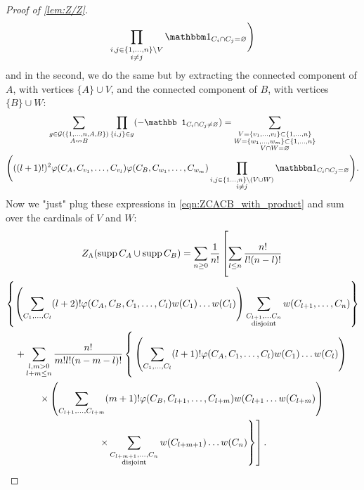 \documentclass{article}
\DeclareMathOperator{\disj}{disjoint}
\DeclareMathOperator{\supp}{supp}
\begin{document}
\begin{proof}[Proof of \cref{lem:Z/Z}]
\begin{multline*}
         \prod_{\substack{i,j\in \{1,\ldots,n\}\setminus V\\i\neq j}}\mathbbm 1_{C_i\cap C_j=\varnothing}\Biggr)
     \end{multline*}
     and in the second, we do the same but by extracting the connected component of $A$, with vertices $\{A\}\cup V$, and the connected component of $B$, with vertices $\{B\}\cup W$:   
     \begin{multline*}
         \sum_{\substack{g \in\mathcal G (\{1,\ldots,n,A,B\})\\A\nleftrightarrow B}}\prod_{\{i,j\}\in g}(-\mathbb 1_{C_i\cap C_j\neq\varnothing})=\sum_{\substack{V=\{v_1,\ldots,v_l\}\subset \{1,\ldots,n\}\\
                 W=\{w_1,\ldots,w_m\}\subset\{1,\ldots,n\}\\
                 V\cap W=\varnothing}}\\\Biggl(((l+1)!)^2\varphi(C_A,C_{v_1},\ldots,C_{v_l})\varphi(C_B,C_{w_1},\ldots,C_{w_m})
         \prod_{\substack{i,j\in \{1\ldots,n\}\setminus (V \cup W)\\i\neq j}}\mathbbm 1_{C_i\cap C_j=\varnothing}\Biggr).
     \end{multline*}
     Now we "just" plug these expressions in \cref{eqn:ZCACB_with_product} and sum over the cardinals of $V$ and $W$:        \begin{multline*}
         Z_\Lambda(\supp C_A\cup \supp C_B)=\sum_{n\geq 0}\frac 1{n!}\left[\sum_{l\leq n} \frac{n!}{l!(n-l)!}
         \vphantom{\sum_{\substack{C_{l+m+1},\ldots,C_{n}\\\disj}}w(C_{l+m+1})\ldots w(C_n)}\right.\\
         \left\{\left(\sum_{C_1,\ldots,C_l}(l+2)!\varphi(C_A,C_B,C_1,\ldots,C_l)w(C_1)\ldots w(C_l)\right)         
         \sum_{\substack{C_{l+1},\ldots C_n\\\disj}}w(C_{l+1},\ldots,C_n)\right\}\\
         +\sum_{\substack{l,m>0\\l+m\leq n}}\frac{n!}{m!l!(n-m-l)!}
         \left\{\vphantom{\sum_{\substack{C_{l+m+1},\ldots,C_{n}\\\disj}}w(C_{l+m+1})\ldots w(C_n)}\left(\sum_{C_1,\ldots,C_l}(l+1)!\varphi(C_A,C_1,\ldots,C_l)w(C_1)\ldots w(C_l)\right)\right.\\
         \times
         \left(\sum_{C_{l+1},\ldots,C_{l+m}}(m+1)!\varphi(C_B,C_{l+1},\ldots,C_{l+m})w(C_{l+1}\ldots w(C_{l+m})\right)
         \\
         \left.\left.\times
         \sum_{\substack{C_{l+m+1},\ldots,C_{n}\\\disj}}w(C_{l+m+1})\ldots w(C_n)\right\}\right].

\end{multline*}
\end{proof}
\end{document}

